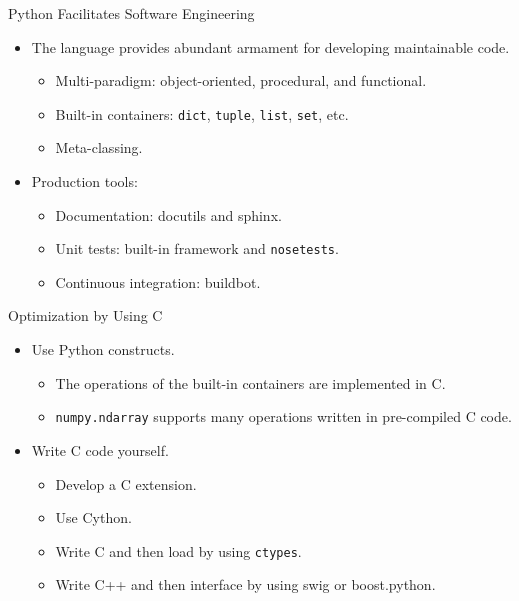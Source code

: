 \documentclass[dvips,xcolor=pst]{beamer}
\begin{document}
\begin{frame}{
%
Python Facilitates Software Engineering
%
}
\begin{itemize} \large
  \item The language provides abundant armament for developing maintainable
  code.
  \begin{itemize} \large
    \item Multi-paradigm: object-oriented, procedural, and functional.
    \item Built-in containers: \texttt{dict}, \texttt{tuple}, \texttt{list}, 
    \texttt{set}, etc.
    \item Meta-classing.
  \end{itemize}
  \item Production tools:
  \begin{itemize} \large
    \item Documentation: docutils and sphinx.
    \item Unit tests: built-in framework and \texttt{nosetests}.
    \item Continuous integration: buildbot.
  \end{itemize}
\end{itemize}
\end{frame}

\begin{frame}{
%
Optimization by Using C
%
}
\begin{itemize} \large
  \item Use Python constructs.
  \begin{itemize} \large
    \item The operations of the built-in containers are implemented in C.
    \item \texttt{numpy.ndarray} supports many operations written in
    pre-compiled C code.
  \end{itemize}
  \item Write C code yourself.
  \begin{itemize} \large
    \item Develop a C extension.
    \item Use Cython.
    \item Write C and then load by using \texttt{ctypes}.
    \item Write C++ and then interface by using swig or boost.python.
  \end{itemize}
\end{itemize}
\end{frame}
\end{document}
